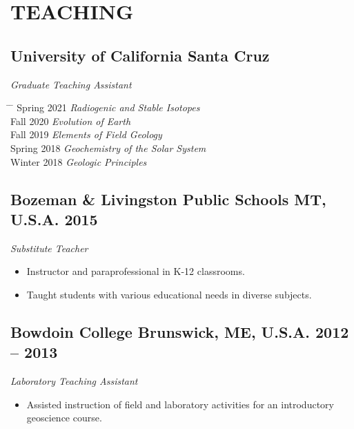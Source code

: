 \documentclass[10pt]{article}
\begin{document}

\section*{TEACHING}

\subsection*{\textbf{University of California Santa Cruz}}
\textit{Graduate Teaching Assistant}
\begin{tabbing} \hspace{10pt} \= \hspace{2.5cm} \=  \kill
\> Spring 2021 \> \textit{Radiogenic and Stable Isotopes}\\
\> Fall 2020 \> \textit{Evolution of Earth}\\
\> Fall 2019 \> \textit{Elements of Field Geology}\\
\> Spring 2018 \>  \textit{Geochemistry of the Solar System}\\
\> Winter 2018 \> \textit{Geologic Principles}
\end{tabbing}

\subsection*{\textbf{Bozeman \& Livingston Public Schools} \hspace{15pt} MT, U.S.A. \hfill 2015}
\textit{Substitute Teacher}
\begin{itemize}
	\item Instructor and paraprofessional in K-12 classrooms.
	\item Taught students with various educational needs in diverse subjects.
\end{itemize}

\subsection*{\textbf{Bowdoin College} \hspace{15pt} Brunswick, ME, U.S.A. \hfill 2012 – 2013}
\textit{Laboratory Teaching Assistant}
\begin{itemize}
	\item Assisted instruction of field and laboratory activities for an introductory geoscience course.
\end{itemize}
\end{document}
